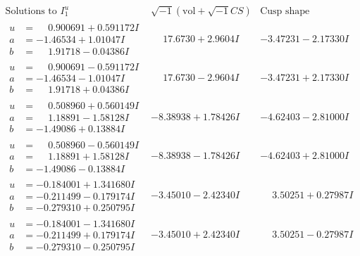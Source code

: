 \documentclass[1p]{elsarticle_modified}
\theoremstyle{definition}
\newcommand{\I}{\sqrt{-1}}
\begin{document}
$$\begin{array}{c|c|c}  
\text{Solutions to }I^u_{1}& \I (\text{vol} + \sqrt{-1}CS) & \text{Cusp shape}\\
 \hline 
\begin{aligned}
u &= \phantom{-}0.900691 + 0.591172 I \\
a &= -1.46534 + 1.01047 I \\
b &= \phantom{-}1.91718 - 0.04386 I\end{aligned}
 & \phantom{-}17.6730 + 2.9604 I & -3.47231 - 2.17330 I \\ \hline\begin{aligned}
u &= \phantom{-}0.900691 - 0.591172 I \\
a &= -1.46534 - 1.01047 I \\
b &= \phantom{-}1.91718 + 0.04386 I\end{aligned}
 & \phantom{-}17.6730 - 2.9604 I & -3.47231 + 2.17330 I \\ \hline\begin{aligned}
u &= \phantom{-}0.508960 + 0.560149 I \\
a &= \phantom{-}1.18891 - 1.58128 I \\
b &= -1.49086 + 0.13884 I\end{aligned}
 & -8.38938 + 1.78426 I & -4.62403 - 2.81000 I \\ \hline\begin{aligned}
u &= \phantom{-}0.508960 - 0.560149 I \\
a &= \phantom{-}1.18891 + 1.58128 I \\
b &= -1.49086 - 0.13884 I\end{aligned}
 & -8.38938 - 1.78426 I & -4.62403 + 2.81000 I \\ \hline\begin{aligned}
u &= -0.184001 + 1.341680 I \\
a &= -0.211499 - 0.179174 I \\
b &= -0.279310 + 0.250795 I\end{aligned}
 & -3.45010 - 2.42340 I & \phantom{-}3.50251 + 0.27987 I \\ \hline\begin{aligned}
u &= -0.184001 - 1.341680 I \\
a &= -0.211499 + 0.179174 I \\
b &= -0.279310 - 0.250795 I\end{aligned}
 & -3.45010 + 2.42340 I & \phantom{-}3.50251 - 0.27987 I \\ \hline\begin{aligned}

\end{aligned}
\end{array}$$
\end{document}
